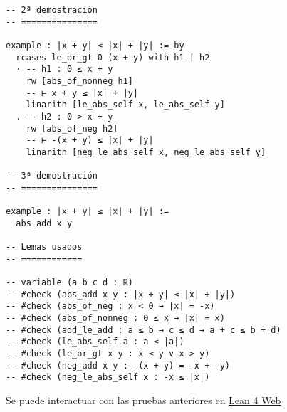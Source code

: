 \begin{verbatim}
-- 2ª demostración
-- ===============

example : |x + y| ≤ |x| + |y| := by
  rcases le_or_gt 0 (x + y) with h1 | h2
  · -- h1 : 0 ≤ x + y
    rw [abs_of_nonneg h1]
    -- ⊢ x + y ≤ |x| + |y|
    linarith [le_abs_self x, le_abs_self y]
  . -- h2 : 0 > x + y
    rw [abs_of_neg h2]
    -- ⊢ -(x + y) ≤ |x| + |y|
    linarith [neg_le_abs_self x, neg_le_abs_self y]

-- 3ª demostración
-- ===============

example : |x + y| ≤ |x| + |y| :=
  abs_add x y

-- Lemas usados
-- ============

-- variable (a b c d : ℝ)
-- #check (abs_add x y : |x + y| ≤ |x| + |y|)
-- #check (abs_of_neg : x < 0 → |x| = -x)
-- #check (abs_of_nonneg : 0 ≤ x → |x| = x)
-- #check (add_le_add : a ≤ b → c ≤ d → a + c ≤ b + d)
-- #check (le_abs_self a : a ≤ |a|)
-- #check (le_or_gt x y : x ≤ y ∨ x > y)
-- #check (neg_add x y : -(x + y) = -x + -y)
-- #check (neg_le_abs_self x : -x ≤ |x|)
\end{verbatim}
Se puede interactuar con las pruebas anteriores en \href{https://lean.math.hhu.de/\#url=https://raw.githubusercontent.com/jaalonso/Calculemus2/main/src/Desigualdad\_triangular\_para\_valor\_absoluto.lean.lean}{Lean 4 Web}

